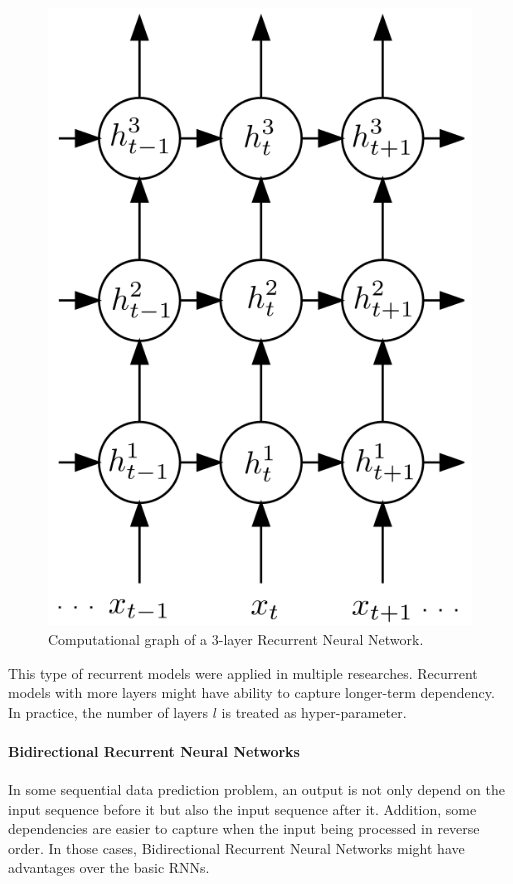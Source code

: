 \begin{figure}[H]
	\centering
	\includegraphics[scale=0.4]{figure/3-layer-lstm}
	\caption{Computational graph of a 3-layer Recurrent Neural Network\cite{GravesLSTM}.}
	\label{fig:3-layer-lstm}
\end{figure}

This type of recurrent models were applied in multiple researches\cite{GravesLSTM}\cite{SutskeverVL14}\cite{ZarembaS14}\cite{treeLSTM}.
Recurrent models with more layers might have ability to capture longer-term dependency\cite{treeLSTM}.
In practice, the number of layers \(l\) is treated as hyper-parameter.

\paragraph{Bidirectional Recurrent Neural Networks}
In some sequential data prediction problem, an output is not only depend on the input sequence before it but also the input sequence after it. 
Addition, some dependencies are easier to capture when the input being processed in reverse order.
In those cases, Bidirectional Recurrent Neural Networks might have advantages over the basic RNNs\cite{GravesLSTM}\cite{Graves-thesis}.

